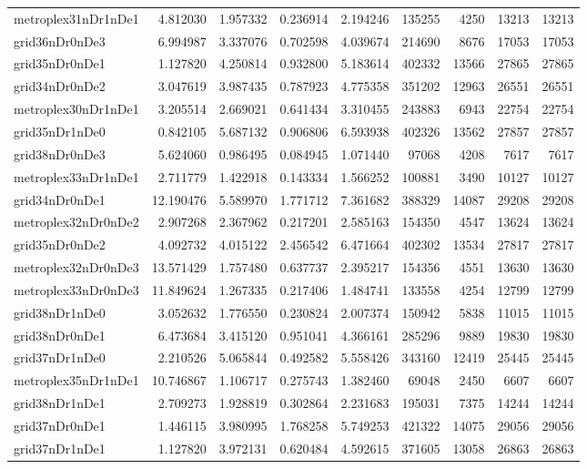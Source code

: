 \begin{longtable}{|l|r|r|r|r|r|r|r|r|}
metroplex31nDr1nDe1 & 4.812030 & 1.957332 & 0.236914 & 2.194246 & 135255 & 4250 & 13213 & 13213 \\
grid36nDr0nDe3 & 6.994987 & 3.337076 & 0.702598 & 4.039674 & 214690 & 8676 & 17053 & 17053 \\
grid35nDr0nDe1 & 1.127820 & 4.250814 & 0.932800 & 5.183614 & 402332 & 13566 & 27865 & 27865 \\
grid34nDr0nDe2 & 3.047619 & 3.987435 & 0.787923 & 4.775358 & 351202 & 12963 & 26551 & 26551 \\
metroplex30nDr1nDe1 & 3.205514 & 2.669021 & 0.641434 & 3.310455 & 243883 & 6943 & 22754 & 22754 \\
grid35nDr1nDe0 & 0.842105 & 5.687132 & 0.906806 & 6.593938 & 402326 & 13562 & 27857 & 27857 \\
grid38nDr0nDe3 & 5.624060 & 0.986495 & 0.084945 & 1.071440 & 97068 & 4208 & 7617 & 7617 \\
metroplex33nDr1nDe1 & 2.711779 & 1.422918 & 0.143334 & 1.566252 & 100881 & 3490 & 10127 & 10127 \\
grid34nDr0nDe1 & 12.190476 & 5.589970 & 1.771712 & 7.361682 & 388329 & 14087 & 29208 & 29208 \\
metroplex32nDr0nDe2 & 2.907268 & 2.367962 & 0.217201 & 2.585163 & 154350 & 4547 & 13624 & 13624 \\
grid35nDr0nDe2 & 4.092732 & 4.015122 & 2.456542 & 6.471664 & 402302 & 13534 & 27817 & 27817 \\
metroplex32nDr0nDe3 & 13.571429 & 1.757480 & 0.637737 & 2.395217 & 154356 & 4551 & 13630 & 13630 \\
metroplex33nDr0nDe3 & 11.849624 & 1.267335 & 0.217406 & 1.484741 & 133558 & 4254 & 12799 & 12799 \\
grid38nDr1nDe0 & 3.052632 & 1.776550 & 0.230824 & 2.007374 & 150942 & 5838 & 11015 & 11015 \\
grid38nDr0nDe1 & 6.473684 & 3.415120 & 0.951041 & 4.366161 & 285296 & 9889 & 19830 & 19830 \\
grid37nDr1nDe0 & 2.210526 & 5.065844 & 0.492582 & 5.558426 & 343160 & 12419 & 25445 & 25445 \\
metroplex35nDr1nDe1 & 10.746867 & 1.106717 & 0.275743 & 1.382460 & 69048 & 2450 & 6607 & 6607 \\
grid38nDr1nDe1 & 2.709273 & 1.928819 & 0.302864 & 2.231683 & 195031 & 7375 & 14244 & 14244 \\
grid37nDr0nDe1 & 1.446115 & 3.980995 & 1.768258 & 5.749253 & 421322 & 14075 & 29056 & 29056 \\
grid37nDr1nDe1 & 1.127820 & 3.972131 & 0.620484 & 4.592615 & 371605 & 13058 & 26863 & 26863 \\

\end{longtable}
